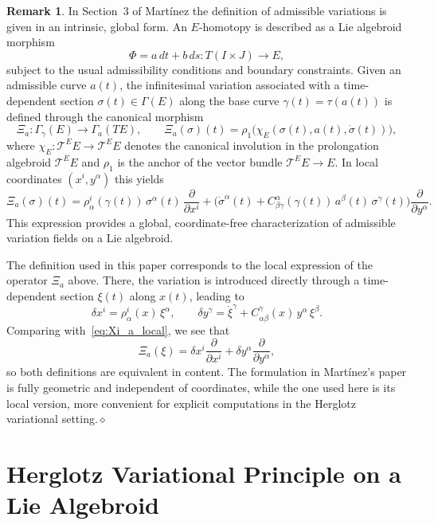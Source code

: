 \documentclass[11pt,a4paper]{article}
\theoremstyle{definition}
\newtheorem{remark}[theorem]{Remark}
\begin{document}
\begin{remark}
    In Section~3 of Martínez \cite{martinez2008variational}
the definition of admissible variations is given in an intrinsic, global form.
An $E$-homotopy is described as a Lie algebroid morphism
\[
\Phi = a\, dt + b\, ds : T(I\times J) \longrightarrow E,
\]
subject to the usual admissibility conditions and boundary constraints.
Given an admissible curve $a(t)$, the infinitesimal variation associated with a
time-dependent section $\sigma(t)\in \Gamma(E)$ along the base curve
$\gamma(t) = \tau(a(t))$
is defined through the canonical morphism
\[
\Xi_a : \Gamma_\gamma(E) \longrightarrow \Gamma_a(TE),
\qquad
\Xi_a(\sigma)(t)
= \rho_1\!\big(\chi_E(\sigma(t), a(t), \dot{\sigma}(t))\big),
\]
where $\chi_E : \mathcal{T}^{E}E\to \mathcal{T}^{E}E$ denotes the canonical involution in the prolongation algebroid $\mathcal{T}^{E}E$
and $\rho_1$ is the anchor of the vector bundle $\mathcal{T}^{E}E\to E$.
In local coordinates $(x^i, y^\alpha)$ this yields
\begin{equation}
\Xi_a(\sigma)(t)
= \rho^i_{\alpha}(\gamma(t))\,\sigma^\alpha(t)\,
\frac{\partial}{\partial x^i}
+ \Big(
\dot{\sigma}^\alpha(t)
+ C^{\alpha}_{\beta\gamma}(\gamma(t))\,a^\beta(t)\,\sigma^\gamma(t)
\Big)
\frac{\partial}{\partial y^\alpha}.
\label{eq:Xi_a_local}
\end{equation}
This expression provides a global, coordinate-free characterization
of admissible variation fields on a Lie algebroid.


The definition used in this paper corresponds to the
local expression of the operator $\Xi_a$ above.
There, the variation is introduced directly through
a time-dependent section $\xi(t)$ along $x(t)$, leading to
\[
\delta x^i = \rho^i_\alpha(x)\,\xi^\alpha,
\qquad
\delta y^\gamma = \dot{\xi}^\gamma
+ C^\gamma_{\alpha\beta}(x)\,y^\alpha\,\xi^\beta.
\]
Comparing with~\eqref{eq:Xi_a_local}, we see that
\[
\Xi_a(\xi) = \delta x^{i}\frac{\partial}{\partial x^i} + \delta y^{\alpha}\frac{\partial}{\partial y^{\alpha}},
\]
so both definitions are equivalent in content.
The formulation in Martínez's paper \cite{martinez2008variational} is fully geometric
and independent of coordinates, while the one used here
is its local version, more convenient for explicit computations
in the Herglotz variational setting.\hfill$\diamond$
\end{remark}


\section{Herglotz Variational Principle on a Lie Algebroid}\label{sec:Herglotz_LA}
\end{document}
